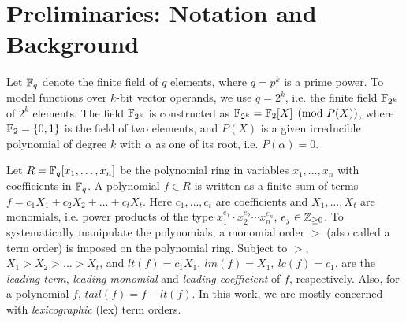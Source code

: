 \section{Preliminaries: Notation and Background}
\label{sec:prelim}


Let ${\mathbb{F}}_q$ denote the finite field of $q$ elements, where $q=p^k$ is
a prime power. To model functions over $k$-bit vector operands, we
use $q = 2^k$, i.e. the finite field ${\mathbb{F}}_{2^k}$ of $2^k$
elements. The field ${\mathbb{F}}_{2^k}$ is constructed as ${\mathbb{F}}_{2^k} = {\mathbb{F}}_{2}[X]\pmod{
  P(X)}$, where ${\mathbb{F}}_{2}=\{0,1\}$ is the field of two elements, and
$P(X)$ is a given irreducible polynomial of degree $k$ with $\alpha$
as one of its root, i.e. $P(\alpha) =0$.  

Let $R={\mathbb{F}}_q[x_1,\dots,x_n]$ be the  polynomial ring in variables
$x_1,\dots,x_n$ with coefficients in ${\mathbb{F}}_q$. A polynomial $f \in R$ is 
written as a finite sum of terms  $f = c_1 X_1 +  c_2 X_2 + \dots +
c_t X_t$.  Here $c_1, \dots, c_t$ are coefficients and $X_1, \dots,
X_t$ are monomials, i.e. power products of the type $x_1^{e_{1}}\cdot
x_2^{e_{2}}\cdots x_n^{e_{n}}$,  $e_j \in {\mathbb{Z}}_{\geq  0}$. To
systematically manipulate the polynomials, a monomial order $>$ (also
called a term order) is imposed on the polynomial ring.
Subject to $>$, $X_1 >X_2 > \dots >  X_t$, and 
$lt(f) = c_1 X_1, ~lm(f) = X_1, ~lc(f) = c_1$, are the {\it
leading   term}, {\it   leading monomial} and {\it   leading
coefficient} of $f$, respectively. Also, for a polynomial $f$,
$tail(f) = f - lt(f)$. In this work, we are mostly concerned with {\it
  lexicographic} (lex) term orders. 
\vspace{0.040in}
